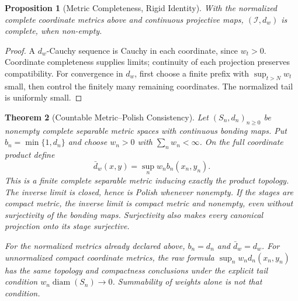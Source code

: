 \documentclass[11pt,a4paper]{article}
\theoremstyle{plain}
\newtheorem{theorem}{Theorem}[section]
\newtheorem{proposition}[theorem]{Proposition}
\theoremstyle{definition}
\theoremstyle{remark}
\newcommand{\I}{\mathcal{I}}
\newcommand{\dw}{d_w}
\begin{document}
\begin{proposition}[Metric Completeness, Rigid Identity]
With the normalized complete coordinate metrics above and continuous projective maps, $(\I,\dw)$ is complete, when non-empty.
\end{proposition}

\begin{proof}
A $\dw$-Cauchy sequence is Cauchy in each coordinate, since $w_t>0$. Coordinate completeness supplies limits; continuity of each projection preserves compatibility. For convergence in $\dw$, first choose a finite prefix with $\sup_{t>N}w_t$ small, then control the finitely many remaining coordinates. The normalized tail is uniformly small.
\end{proof}

\begin{theorem}[Countable Metric--Polish Consistency]\label{thm:compact-polish-consistency}
Let $(S_n,d_n)_{n\geq0}$ be nonempty complete separable metric spaces with
continuous bonding maps. Put $b_n=\min\{1,d_n\}$ and choose $w_n>0$ with
$\sum_nw_n<\infty$. On the full coordinate product define
\[
 \bar d_w(x,y)=\sup_n w_n b_n(x_n,y_n).
\]
This is a finite complete separable metric inducing exactly the product
topology. The inverse limit is closed, hence is Polish whenever nonempty.
If the stages are compact metric, the inverse limit is compact metric and
nonempty, even without surjectivity of the bonding maps. Surjectivity also
makes every canonical projection onto its stage surjective.

For the normalized metrics already declared above, $b_n=d_n$ and
$\bar d_w=\dw$. For unnormalized compact coordinate metrics, the raw formula
$\sup_n w_nd_n(x_n,y_n)$ has the same topology and compactness conclusions
under the explicit tail condition $w_n\operatorname{diam}(S_n)\to0$.
Summability of weights alone is not that condition.
\end{theorem}
\end{document}
